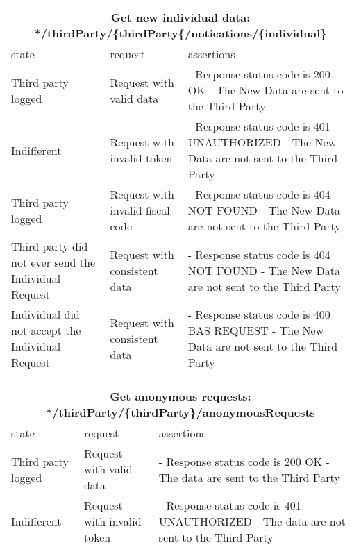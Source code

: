 \begin{center}
	\begin{tabular}{|p{}|p{}|p{}|}
		\hline
		\multicolumn{3}{c}{Get new individual data: */thirdParty/\{thirdParty\{/notications/\{individual\}}\\

		\hline
		state & request & assertions \\
		
		\hline
		Third party logged&
		Request with valid data & 
		- Response status code is 200 OK\newline
		- The New Data are sent to the Third Party
		\\
		
		\hline
		Indifferent&
		Request with invalid token & 
		- Response status code is 401 UNAUTHORIZED \newline
		- The New Data are not sent to the Third Party
		\\
		\hline
		Third party logged&
		Request with invalid fiscal code & 
		- Response status code is 404 NOT FOUND\newline
		- The New Data are not sent to the Third Party
		\\
		\hline
		Third party did not ever send the Individual Request&
		Request with consistent data & 
		- Response status code is 404 NOT FOUND\newline
		- The New Data are not sent to the Third Party
		\\
		\hline
		Individual did not accept the Individual Request&
		Request with consistent data & 
		- Response status code is 400 BAS REQUEST\newline
		- The New Data are not sent to the Third Party
		\\
		\hline
	\end{tabular}
\end{center}

\begin{center}
	\begin{tabular}{|p{}|p{}|p{}|}
		\hline
		\multicolumn{3}{c}{Get anonymous requests: */thirdParty/\{thirdParty\}/anonymousRequests}\\

		\hline
		state & request & assertions \\
		
		\hline
		Third party logged&
		Request with valid data & 
		- Response status code is 200 OK\newline
		- The data are sent to the Third Party
		\\
		
		\hline
		Indifferent&
		Request with invalid token & 
		- Response status code is 401 UNAUTHORIZED \newline
		- The data are not sent to the Third Party
		\\
		\hline
	\end{tabular}
\end{center}

